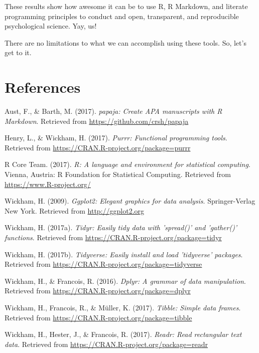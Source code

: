 \documentclass[english,man]{apa6}
\theoremstyle{definition}
\theoremstyle{definition}
\theoremstyle{remark}
\begin{document}
These results show how awesome it can be to use R, R Markdown, and
literate programming principles to conduct and open, transparent, and
reproducible psychological science. Yay, us!

There are no limitations to what we can accomplish using these tools.
So, let's get to it.

\newpage

\section{References}\label{references}

\setlength{\parindent}{-0.5in} \setlength{\leftskip}{0.5in}

\hypertarget{refs}{}
\hypertarget{ref-R-papaja}{}
Aust, F., \& Barth, M. (2017). \emph{papaja: Create APA manuscripts with
R Markdown}. Retrieved from \url{https://github.com/crsh/papaja}

\hypertarget{ref-R-purrr}{}
Henry, L., \& Wickham, H. (2017). \emph{Purrr: Functional programming
tools}. Retrieved from \url{https://CRAN.R-project.org/package=purrr}

\hypertarget{ref-R-base}{}
R Core Team. (2017). \emph{R: A language and environment for statistical
computing}. Vienna, Austria: R Foundation for Statistical Computing.
Retrieved from \url{https://www.R-project.org/}

\hypertarget{ref-R-ggplot2}{}
Wickham, H. (2009). \emph{Ggplot2: Elegant graphics for data analysis}.
Springer-Verlag New York. Retrieved from \url{http://ggplot2.org}

\hypertarget{ref-R-tidyr}{}
Wickham, H. (2017a). \emph{Tidyr: Easily tidy data with 'spread()' and
'gather()' functions}. Retrieved from
\url{https://CRAN.R-project.org/package=tidyr}

\hypertarget{ref-R-tidyverse}{}
Wickham, H. (2017b). \emph{Tidyverse: Easily install and load
'tidyverse' packages}. Retrieved from
\url{https://CRAN.R-project.org/package=tidyverse}

\hypertarget{ref-R-dplyr}{}
Wickham, H., \& Francois, R. (2016). \emph{Dplyr: A grammar of data
manipulation}. Retrieved from
\url{https://CRAN.R-project.org/package=dplyr}

\hypertarget{ref-R-tibble}{}
Wickham, H., Francois, R., \& Müller, K. (2017). \emph{Tibble: Simple
data frames}. Retrieved from
\url{https://CRAN.R-project.org/package=tibble}

\hypertarget{ref-R-readr}{}
Wickham, H., Hester, J., \& Francois, R. (2017). \emph{Readr: Read
rectangular text data}. Retrieved from
\url{https://CRAN.R-project.org/package=readr}
\end{document}
